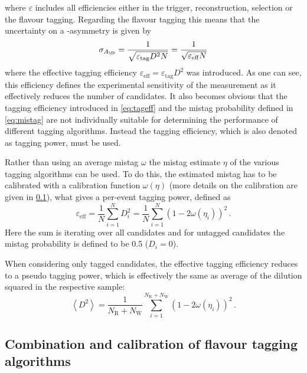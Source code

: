where $\varepsilon$ includes all efficiencies either in the trigger, reconstruction, selection or the flavour tagging.
Regarding the flavour tagging this means that the uncertainty on a \CP-asymmetry is given by
\begin{equation}
\sigma_{A_{\CP}}=\frac{1}{\sqrt{\varepsilon_{\text{tag}}D^2N}}=\frac{1}{\sqrt{\varepsilon_{\text{eff}}N}}
\end{equation}
where the effective tagging efficiency $\varepsilon_{\text{eff}}=\varepsilon_{\text{tag}}D^2$ was introduced.
As one can see, this efficiency defines the experimental sensitivity of the measurement as it effectively reduces the number of candidates.
It also becomes obvious that the tagging efficiency introduced in \cref{eq:tageff} and the mistag probability defined in \cref{eq:mistag} are not individually suitable for determining the performance of different tagging algorithms.
Instead the tagging efficiency, which is also denoted as tagging power, must be used.

Rather than using an average mistag $\omega$ the mistag estimate $\eta$ of the various tagging algorithms can be used.
To do this, the estimated mistag has to be calibrated with a calibration function $\omega(\eta)$ (more details on the calibration are given in \cref{sec:CombAndCalib}), what gives a per-event tagging power, defined as
\begin{equation}
\varepsilon_{\text{eff}}=\frac{1}{N}\sum_{i=1}^{N}D_i^2=\frac{1}{N}\sum_{i=1}^{N}\left(1-2\omega(\eta_i)\right)^2\,.\label{eq:perEenttaggingpower}
\end{equation}
Here the sum is iterating over all candidates and for untagged candidates the mistag probability is defined to be \num{0.5} ($D_i=0$).

When considering only tagged candidates, the effective tagging efficiency reduces to a pseudo tagging power, which is effectively the same as average of the dilution squared in the respective sample:
\begin{equation}
\left<D^2\right>=\frac{1}{N_{\text{R}}+N_{\text{W}}}\sum_{i=1}^{N_{\text{R}}+N_{\text{W}}}\left(1-2\omega(\eta_i)\right)^2\,.\label{eq:avgDilution}
\end{equation}

\subsection{Combination and calibration of flavour tagging algorithms}
\label{sec:CombAndCalib}

